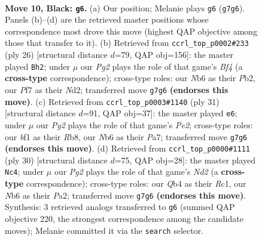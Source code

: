 \documentclass[11pt]{article}
\begin{document}
\clearpage

\begin{figure}[p]\centering
\begin{subfigure}{0.46\textwidth}\centering
\resizebox{\linewidth}{!}{%
\newchessgame
\chessboard[
  setfen={rnb2rk1/ppp2ppp/1n2p3/3pP3/1q1P1PPP/2N5/PPP5/1R1QKBNR b K - 0 10},
  showmover=false,
  pgfstyle=straightmove, color=movearrow, markmove={g7-g6}
]}
\caption{}
\end{subfigure}\hfill
\begin{subfigure}{0.46\textwidth}\centering
\resizebox{\linewidth}{!}{%
\newchessgame
\chessboard[
  setfen={r1q1k2r/pp2bpp1/2n1p1p1/1Q1p3n/3P1B2/2P2N1P/PP1N1PP1/R4RK1 w kq - 4 14},
  showmover=false,
  pgfstyle=straightmove, color=movearrow, markmove={f4-h2}
]}
\caption{}
\end{subfigure}
\\[4pt]
\begin{subfigure}{0.46\textwidth}\centering
\resizebox{\linewidth}{!}{%
\newchessgame
\chessboard[
  setfen={1rr3k1/p2nppbp/2pp1np1/q7/4PP2/P1N1B3/1PP1B1PP/1R2QR1K b - - 2 16},
  showmover=false,
  pgfstyle=straightmove, color=movearrow, markmove={e7-e6}
]}
\caption{}
\end{subfigure}\hfill
\begin{subfigure}{0.46\textwidth}\centering
\resizebox{\linewidth}{!}{%
\newchessgame
\chessboard[
  setfen={r2q1rk1/1p3pp1/1nnpp1bp/8/p2P4/Q3PN2/PP1NBPPP/R1R3K1 w - - 0 16},
  showmover=false,
  pgfstyle=straightmove, color=movearrow, markmove={d2-c4}
]}
\caption{}
\end{subfigure}
\caption{\textbf{Move 10, Black: \texttt{g6}.} (a) Our position; Melanie plays \texttt{g6} (\texttt{g7g6}). Panels (b)--(d) are the retrieved master positions whose correspondence most drove this move (highest QAP objective among those that transfer to it). (b) Retrieved from \texttt{ccrl\_top\_p0002\#233} (ply 26) [structural distance $d$=79, QAP obj=156]: the master played \texttt{Bh2}; under $\mu$ our \emph{Pg2} plays the role of that game's \emph{Bf4} (a \textbf{cross-type} correspondence); cross-type roles: our \emph{N}b6 as their \emph{P}b2, our \emph{P}f7 as their \emph{N}d2; transferred move \texttt{g7g6} \textbf{(endorses this move)}. (c) Retrieved from \texttt{ccrl\_top\_p0003\#1140} (ply 31) [structural distance $d$=91, QAP obj=37]: the master played \texttt{e6}; under $\mu$ our \emph{Pg2} plays the role of that game's \emph{Pe2}; cross-type roles: our \emph{b}f1 as their \emph{R}b8, our \emph{N}b6 as their \emph{P}a7; transferred move \texttt{g7g6} \textbf{(endorses this move)}. (d) Retrieved from \texttt{ccrl\_top\_p0000\#1111} (ply 30) [structural distance $d$=75, QAP obj=28]: the master played \texttt{Nc4}; under $\mu$ our \emph{Pg2} plays the role of that game's \emph{Nd2} (a \textbf{cross-type} correspondence); cross-type roles: our \emph{Q}b4 as their \emph{R}c1, our \emph{N}b6 as their \emph{P}a2; transferred move \texttt{g7g6} \textbf{(endorses this move)}. Synthesis: 3 retrieved analogs transferred to \texttt{g6} (summed QAP objective 220, the strongest correspondence among the candidate moves); Melanie committed it via the \texttt{search} selector.}
\label{fig:thought-m19}
\end{figure}
\end{document}
